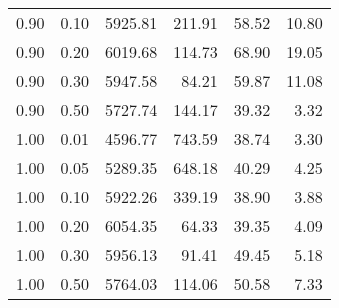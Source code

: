 \begin{table}
\begin{tabular}{rrrrrr}
0.90 & 0.10 & 5925.81 & 211.91 & 58.52 & 10.80 \\
0.90 & 0.20 & 6019.68 & 114.73 & 68.90 & 19.05 \\
0.90 & 0.30 & 5947.58 & 84.21 & 59.87 & 11.08 \\
0.90 & 0.50 & 5727.74 & 144.17 & 39.32 & 3.32 \\
1.00 & 0.01 & 4596.77 & 743.59 & 38.74 & 3.30 \\
1.00 & 0.05 & 5289.35 & 648.18 & 40.29 & 4.25 \\
1.00 & 0.10 & 5922.26 & 339.19 & 38.90 & 3.88 \\
1.00 & 0.20 & 6054.35 & 64.33 & 39.35 & 4.09 \\
1.00 & 0.30 & 5956.13 & 91.41 & 49.45 & 5.18 \\
1.00 & 0.50 & 5764.03 & 114.06 & 50.58 & 7.33 \\
\bottomrule
\end{tabular}
\end{table}
